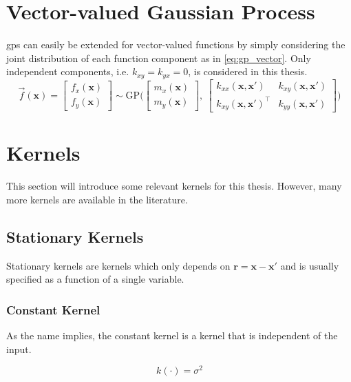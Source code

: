 \section{Vector-valued Gaussian Process}\label{sec:theory_vector_gp}
\acrshort{gp}s can easily be extended for vector-valued functions by simply considering the joint distribution of each function component as in \cref{eq:gp_vector}. Only independent components, i.e. $k_{xy}=k_{yx}=0$, is considered in this thesis.
\begin{equation}\label{eq:gp_vector}
     \vec{f}(\boldsymbol{x}) = \begin{bmatrix} f_x (\boldsymbol{x})\\ f_y (\boldsymbol{x})\end{bmatrix} \sim \text{GP} \big(\begin{bmatrix} m_x(\boldsymbol{x})\\m_y(\boldsymbol{x})\end{bmatrix}, \ \begin{bmatrix}
    k_{xx}(\boldsymbol{x}, \boldsymbol{x}') & k_{xy}(\boldsymbol{x}, \boldsymbol{x}') \\ k_{xy}(\boldsymbol{x}, \boldsymbol{x}')^\intercal & k_{yy}(\boldsymbol{x}, \boldsymbol{x}')
    \end{bmatrix}\big) 
\end{equation}

\section{Kernels}\label{sec:kernels}
This section will introduce some relevant kernels for this thesis. However, many more kernels are available in the literature. 
\subsection{Stationary Kernels}
Stationary kernels are kernels which only depends on $\boldsymbol{r} = \boldsymbol{x} - \boldsymbol{x'}$ and is usually specified as a function of a single variable.
\subsubsection{Constant Kernel}
As the name implies, the constant kernel is a kernel that is independent of the input.

\begin{equation}
    k(\boldsymbol{\cdot}) = \sigma^2
\end{equation}


